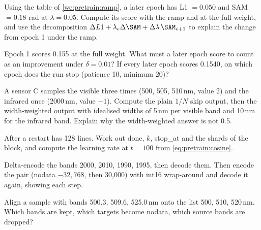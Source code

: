 \begin{checkyourself}
\item\label{ex:pretrain:1} Using the table of \cref{we:pretrain:ramp}, a later epoch has L1 $= 0.050$ and SAM $= 0.18$ rad at
  $\lambda = 0.05$. Compute its score with the ramp and at the full weight, and use the decomposition
  $\Delta L1 + \lambda_e\Delta\SAM + \Delta\lambda\,\SAM_{e+1}$ to explain the change from epoch 1 under the ramp.
\item\label{ex:pretrain:2} Epoch 1 scores 0.155 at the full weight. What must a later epoch score to count as an improvement under
  $\delta = 0.01$? If every later epoch scores 0.1540, on which epoch does the run stop (patience 10, minimum 20)?
\item\label{ex:pretrain:3} A sensor C samples the visible three times (500, 505, 510\,nm, value 2) and the infrared once (2000\,nm,
  value $-1$). Compute the plain $1/N$ skip output, then the width-weighted output with idealised widths of 5\,nm per visible band
  and 10\,nm for the infrared band. Explain why the width-weighted answer is not 0.5.
\item\label{ex:pretrain:4} After a restart  has 128 lines. Work out done, $k$, stop\_at and the shards of the block,
  and compute the learning rate at $t = 100$ from \eqref{eq:pretrain:cosine}.
\item\label{ex:pretrain:5} Delta-encode the bands 2000, 2010, 1990, 1995, then decode them. Then encode the pair (nodata $-32{,}768$,
  then 30{,}000) with int16 wrap-around and decode it again, showing each step.
\item\label{ex:pretrain:6} Align a sample with bands 500.3, 509.6, 525.0\,nm onto the list 500, 510, 520\,nm. Which bands are kept,
  which targets become nodata, which source bands are dropped?
\end{checkyourself}

\endgroup
